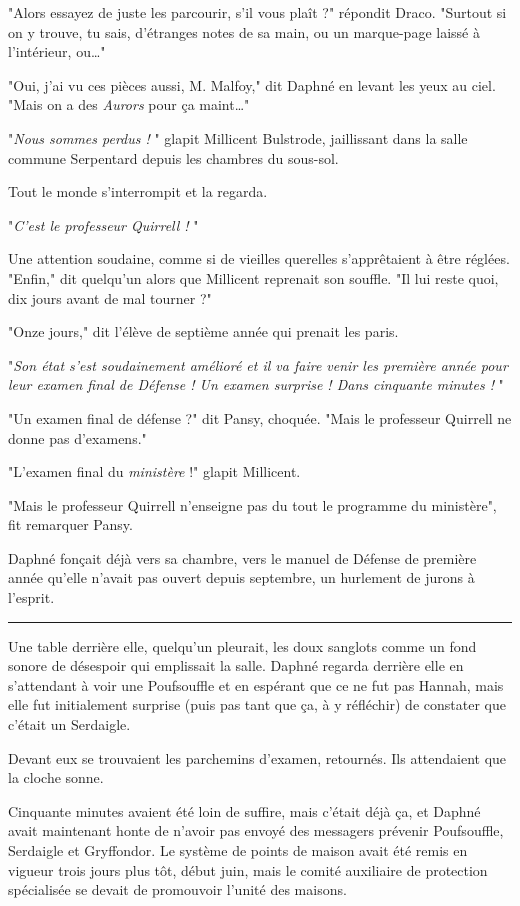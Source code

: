 "Alors essayez de juste les parcourir, s'il vous plaît ?" répondit Draco. "Surtout si on y trouve, tu sais, d'étranges notes de sa main, ou un marque-page laissé à l'intérieur, ou…"

"Oui, j'ai vu ces pièces aussi, M. Malfoy," dit Daphné en levant les yeux au ciel. "Mais on a des \emph{Aurors}  pour ça maint…"

"\emph{Nous sommes perdus !} " glapit Millicent Bulstrode, jaillissant dans la salle commune Serpentard depuis les chambres du sous-sol.

Tout le monde s'interrompit et la regarda.

"\emph{C'est le professeur Quirrell !} "

Une attention soudaine, comme si de vieilles querelles s'apprêtaient à être réglées. "Enfin," dit quelqu'un alors que Millicent reprenait son souffle. "Il lui reste quoi, dix jours avant de mal tourner ?"

"Onze jours," dit l'élève de septième année qui prenait les paris.

"\emph{Son état s'est soudainement amélioré et il va faire venir les première année pour leur examen final de Défense ! Un examen surprise ! Dans cinquante minutes !} "

"Un examen final de défense ?" dit Pansy, choquée. "Mais le professeur Quirrell ne donne pas d'examens."

"L'examen final du \emph{ministère}  !" glapit Millicent.

"Mais le professeur Quirrell n'enseigne pas du tout le programme du ministère", fit remarquer Pansy.

Daphné fonçait déjà vers sa chambre, vers le manuel de Défense de première année qu'elle n'avait pas ouvert depuis septembre, un hurlement de jurons à l'esprit.
\par\noindent\rule{\textwidth}{0.4pt}
Une table derrière elle, quelqu'un pleurait, les doux sanglots comme un fond sonore de désespoir qui emplissait la salle. Daphné regarda derrière elle en s'attendant à voir une Poufsouffle et en espérant que ce ne fut pas Hannah, mais elle fut initialement surprise (puis pas tant que ça, à y réfléchir) de constater que c'était un Serdaigle.

Devant eux se trouvaient les parchemins d'examen, retournés. Ils attendaient que la cloche sonne.

Cinquante minutes avaient été loin de suffire, mais c'était déjà ça, et Daphné avait maintenant honte de n'avoir pas envoyé des messagers prévenir Poufsouffle, Serdaigle et Gryffondor. Le système de points de maison avait été remis en vigueur trois jours plus tôt, début juin, mais le comité auxiliaire de protection spécialisée se devait de promouvoir l'unité des maisons.

